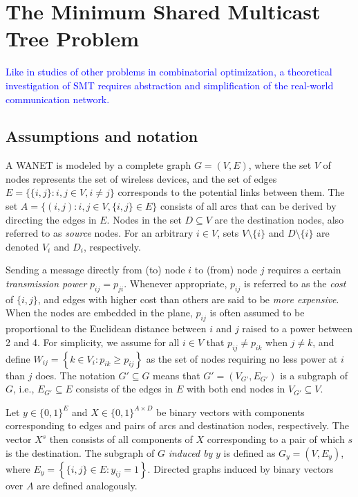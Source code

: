 \section{The Minimum Shared Multicast Tree Problem}
\label{sec:SBT}
\textcolor{blue}{Like in studies of other problems in combinatorial optimization,
a theoretical investigation of SMT requires abstraction and simplification of the real-world communication network.}

\subsection{Assumptions and notation} \label{sec:notation}

A WANET is modeled by a complete graph $G=(V,E)$, where the set $V$ of nodes represents the set of wireless devices,
and the set of edges $E=\{\{i,j\}:i,j\in V, i\neq j\}$ corresponds to the potential links between them.
The set $A=\{(i,j):i,j\in V,\{i,j\}\in E\}$ consists of all arcs that can be derived by directing the edges in $E$.
Nodes in the set $D\subseteq V$ are the destination nodes, also referred to as \emph{source} nodes.
For an arbitrary $i\in V$, sets $V\setminus \{i\}$ and $D\setminus\{i\}$ are denoted $V_i$ and $D_i$, respectively.

Sending a message directly from (to) node $i$ to (from) node $j$ requires a certain \emph{transmission power} $p_{ij}=p_{ji}$.
Whenever appropriate, $p_{ij}$ is referred to as the \emph{cost} of $\{i,j\}$,
and edges with higher cost than others are said to be \emph{more expensive}.
When the nodes are embedded in the plane, $p_{ij}$ is often assumed \citep{Papadimitriou06SBT,Haugland12Dual,halgamuge} to be
proportional to the Euclidean distance between $i$ and $j$ raised to a power between 2 and 4.
For simplicity, we assume for all $i\in V$ that $p_{ij}\neq p_{ik}$ when $j\neq k$, and define
$W_{ij}=\left\{k\in V_i: p_{ik}\geq p_{ij}\right\}$
as the set of nodes requiring no less power at $i$ than $j$ does.
The notation $G'\subseteq G$ means that $G'=(V_{G'},E_{G'})$ is a subgraph of $G$, i.e., $E_{G'}\subseteq E$ consists of the edges in $E$ with both end nodes in $V_{G'}\subseteq V$.

Let $y \in \{0,1\}^E$ and $X\in\{0,1\}^{A\times D}$ be binary vectors with components corresponding to
edges and pairs of arcs and destination nodes, respectively.
The vector $X^s$ then consists of all components of $X$ corresponding to a pair of which $s$ is the destination.
The subgraph of $G$ \emph{induced by} $y$ is defined as $G_y=(V,E_y)$, where $E_y=\left\{\{i,j\}\in E: y_{ij}=1\right\}$.
Directed graphs induced by binary vectors over $A$ are defined analogously.

